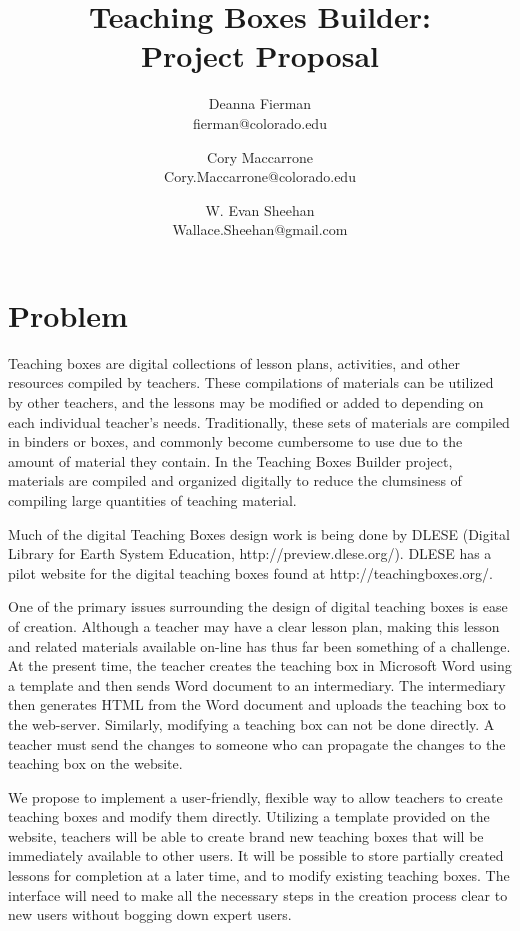 \documentclass[12pt,titlepage]{article}
\title{Teaching Boxes Builder: \\ Project Proposal}
\author{Deanna Fierman \\ \small{fierman@colorado.edu} \and
        Cory Maccarrone \\ \small{Cory.Maccarrone@colorado.edu} \and
		W. Evan Sheehan \\ \small{Wallace.Sheehan@gmail.com}}
\begin{document}
\maketitle

\hfill
\thispagestyle{empty}
\pagebreak
\setcounter{page}{0}

\section{Problem}

Teaching boxes are digital collections of lesson plans, activities, and other
resources compiled by teachers. These compilations of materials can be utilized
by other teachers, and the lessons may be modified or added to depending on each
individual teacher's needs. Traditionally, these sets of materials are compiled
in binders or boxes, and commonly become cumbersome to use due to the amount of
material they contain.  In the Teaching Boxes Builder project, materials are
compiled and organized digitally to reduce the clumsiness of compiling large
quantities of teaching material.

Much of the digital Teaching Boxes design work is being done by DLESE (Digital
Library for Earth System Education, http://preview.dlese.org/). DLESE has a
pilot website for the digital teaching boxes found at http://teachingboxes.org/.

One of the primary issues surrounding the design of digital teaching boxes is
ease of creation.  Although a teacher may have a clear lesson plan, making this
lesson and related materials available on-line has thus far been something of a
challenge.  At the present time, the teacher creates the teaching box in
Microsoft Word using a template and then sends Word document to an intermediary.
The intermediary then generates HTML from the Word document and uploads the
teaching box to the web-server. Similarly, modifying a teaching box can not be
done directly. A teacher must send the changes to someone who can propagate the
changes to the teaching box on the website.

We propose to implement a user-friendly, flexible way to allow teachers to
create teaching boxes and modify them directly. Utilizing a template provided on
the website, teachers will be able to create brand new teaching boxes that will
be immediately available to other users. It will be possible to store partially
created lessons for completion at a later time, and to modify existing teaching
boxes. The interface will need to make all the necessary steps in the creation
process clear to new users without bogging down expert users.
\end{document}
